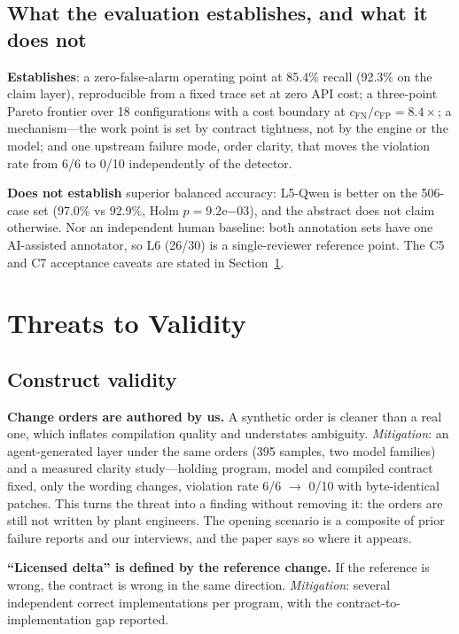 \documentclass[acmsmall,screen,review,anonymous]{acmart}
\begin{document}
\subsection{What the evaluation establishes, and what it does not}

\textbf{Establishes}: a zero-false-alarm operating point at 85.4\% recall (92.3\% on the claim layer), reproducible from a fixed trace set at zero API cost; a three-point Pareto frontier over 18 configurations with a cost boundary at $c_{\mathrm{FN}}/c_{\mathrm{FP}}=8.4\times$; a mechanism---the work point is set by contract tightness, not by the engine or the model; and one upstream failure mode, order clarity, that moves the violation rate from 6/6 to 0/10 independently of the detector.

\textbf{Does not establish} superior balanced accuracy: L5-Qwen is better on the 506-case set (97.0\% vs 92.9\%, Holm $p=9.2\mathrm{e}{-03}$), and the abstract does not claim otherwise. Nor an independent human baseline: both annotation sets have one AI-assisted annotator, so L6 (26/30) is a single-reviewer reference point. The C5 and C7 acceptance caveats are stated in Section~\ref{sec:threats}.

\section{Threats to Validity}
\label{sec:threats}

\subsection{Construct validity}

\textbf{Change orders are authored by us.} A synthetic order is cleaner than a real one, which inflates compilation quality and understates ambiguity. \emph{Mitigation}: an agent-generated layer under the same orders (395 samples, two model families) and a measured clarity study---holding program, model and compiled contract fixed, only the wording changes, violation rate 6/6 $\to$ 0/10 with byte-identical patches. This turns the threat into a finding without removing it: the orders are still not written by plant engineers. The opening scenario is a composite of prior failure reports and our interviews, and the paper says so where it appears.

\textbf{``Licensed delta'' is defined by the reference change.} If the reference is wrong, the contract is wrong in the same direction. \emph{Mitigation}: several independent correct implementations per program, with the contract-to-implementation gap reported.
\end{document}
